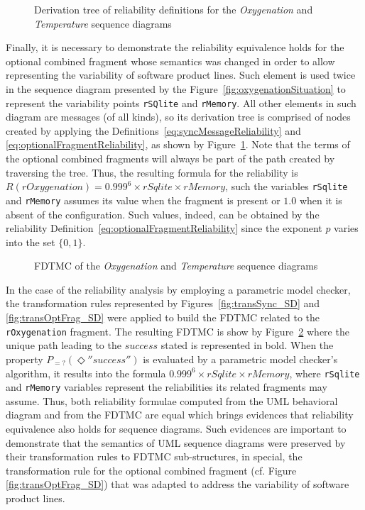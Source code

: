 \begin{figure}[htp]
	\centering
	\resizebox{\columnwidth}{!}{}
	\caption{Derivation tree of reliability definitions for the \emph{Oxygenation} and \emph{Temperature} sequence diagrams}
	\label{fig:derivationTreeOxygenation}
\end{figure}

Finally, it is necessary to demonstrate the reliability equivalence holds for
the optional combined fragment whose semantics was changed in order to allow
representing the variability of software product lines. Such element is used
twice in the sequence diagram presented by the
Figure~\ref{fig:oxygenationSituation} to represent the variability points
\texttt{rSQlite} and \texttt{rMemory}. All other elements in such diagram are
messages (of all kinds), so its derivation tree is comprised of nodes created
by applying the Definitions~\ref{eq:syncMessageReliability} and
\ref{eq:optionalFragmentReliability}, as shown by
Figure~\ref{fig:derivationTreeOxygenation}. Note that the terms of the optional
combined fragments will always be part of the path created by traversing the
tree. Thus, the resulting formula for the reliability is $R(rOxygenation) =
0.999^6 \times rSqlite \times rMemory$, such the variables \texttt{rSqlite} and
\texttt{rMemory} assumes its value when the fragment is present or $1.0$ when
it is absent of the configuration. Such values, indeed, can be obtained by the
reliability Definition~\ref{eq:optionalFragmentReliability} since the exponent
$p$ varies into the set $\{0,1\}$. 

\begin{figure}[htp]
	\centering
	\resizebox{\columnwidth}{!}{}
	\caption{FDTMC of the \emph{Oxygenation} and \emph{Temperature} sequence diagrams}
	\label{fig:fdtmcOxygenationTemperature}
\end{figure}

In the case of the reliability analysis by employing a parametric model checker, the transformation rules represented by Figures~\ref{fig:transSync_SD} and \ref{fig:transOptFrag_SD} were applied to build the FDTMC related to the \texttt{rOxygenation} fragment. The resulting FDTMC is show by Figure~\ref{fig:fdtmcOxygenationTemperature} where the unique path leading to the $success$ stated is represented in bold. When the property $P_{=?}(\Diamond''success'')$ is evaluated by a parametric model checker's algorithm, it results into the formula $0.999^6 \times rSqlite \times rMemory$, where \texttt{rSqlite} and \texttt{rMemory} variables represent the reliabilities its related fragments may assume. Thus, both reliability formulae computed from the UML behavioral diagram and from the FDTMC are equal which brings evidences that reliability equivalence also holds for sequence diagrams. Such evidences are important to demonstrate that the semantics of UML sequence diagrams were preserved by their transformation rules to FDTMC sub-structures, in special, the transformation rule for the optional combined fragment (cf. Figure \ref{fig:transOptFrag_SD}) that was adapted to address the variability of software product lines.



